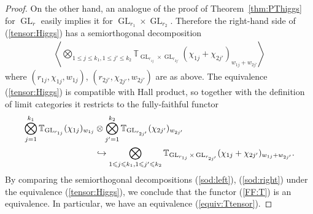 \documentclass [11pt,oneside,a4paper,mathscr]{amsart}
\theoremstyle{definition}
\renewcommand{\leq}{\leqslant}
\newcommand{\GL}{\operatorname{GL}}
\begin{document}
\begin{proof}
On the other hand, an analogue of the proof of Theorem~\ref{thm:PThiggs}
for $\GL_r$ easily implies it for $\GL_{r_1}\times \GL_{r_2}$. 
Therefore the right-hand side of (\ref{tensor:Higgs})
has a semiorthogonal decomposition 
\begin{align}\label{sod:right}
    \left\langle \bigotimes_{1\leq j\leq k_1, 1\leq j'\leq k_2}
    \mathbb{T}_{\GL_{r_{1j}}\times \GL_{r_{2j'}}}(\chi_{1j}+\chi_{2j'})_{w_{1j}+w_{2j'}}\right\rangle
\end{align}
where $(r_{1j}, \chi_{1j}, w_{1j})$, $(r_{2j'}, \chi_{2j'}, w_{2j'})$ are as above. 
The equivalence (\ref{tensor:Higgs}) is compatible with Hall product, so together with the 
definition of limit categories it restricts to the fully-faithful 
functor 
\begin{align}\notag
    \bigotimes_{j=1}^{k_1}\mathbb{T}_{\GL_{r_{1j}}}(\chi_{1j})_{w_{1j}} &\otimes
\bigotimes_{j'=1}^{k_2}\mathbb{T}_{\GL_{r_{2j'}}}(\chi_{2j'})_{w_{2j'}} \\
\label{FF:T}&\hookrightarrow \bigotimes_{1\leq j\leq k_1, 1\leq j'\leq k_2}\mathbb{T}_{\GL_{r_{1j}}\times \GL_{r_{2j'}}}(\chi_{1j}+\chi_{2j'})_{w_{1j}+w_{2j'}}.
\end{align}
By comparing the semiorthogonal decompositions (\ref{sod:left}), (\ref{sod:right}) under the 
equivalence (\ref{tensor:Higgs}), we conclude that the functor (\ref{FF:T}) is an equivalence. In particular, 
we have an equivalence (\ref{equiv:Ttensor}). 

\end{proof}
\end{document}
